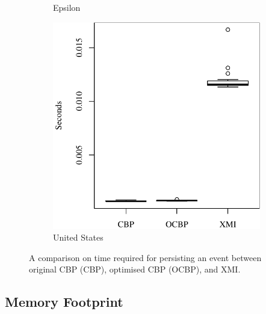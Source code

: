 \documentclass{llncs}
\begin{document}
{\begin{figure}[t]
\begin{subfigure}{0.325\textwidth}
            \caption{Epsilon}
            \label{fig:save_time_epsilon}
        \end{subfigure}
        \hfill
        \begin{subfigure}{0.325\textwidth}
            \centering
            \includegraphics[width=\linewidth]{images/save_time_wikipedia}
            \caption{United States}
            \label{fig:save_time_wikipedia}
        \end{subfigure}
        \caption{A comparison on time required for persisting an event between original CBP (CBP), optimised CBP (OCBP), and XMI.}
        \label{fig:savetime}
    \end{figure}
    
    \vspace{-10pt}
    \subsection{Memory Footprint}
    \label{subsec:memory_consumption}
    
}
\end{document}
